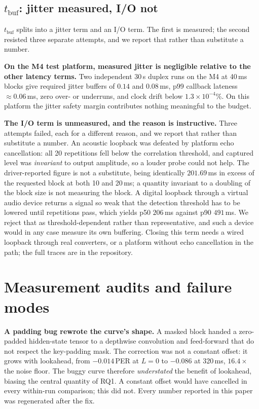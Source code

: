 \documentclass[journal]{IEEEtran}
\newcommand{\tbuf}{\ensuremath{t_{\mathrm{buf}}}}
\begin{document}
\subsection{\texorpdfstring{\tbuf{}}{t\_buf}: jitter measured, I/O not}

\tbuf{} splits into a jitter term and an I/O term. The first is measured; the
second resisted three separate attempts, and we report that rather than
substitute a number.

\textbf{On the M4 test platform, measured jitter is negligible relative to the
other latency terms.} Two independent 30\,s duplex runs on the M4 at
40\,ms blocks give required jitter buffers of $0.14$ and $0.08$\,ms, p99
callback lateness ${\approx}0.06$\,ms, zero over- or underruns, and clock drift
below $1.3\times10^{-4}$\%. On this platform the jitter safety margin
contributes nothing meaningful to the budget.

\textbf{The I/O term is unmeasured, and the reason is instructive.} Three
attempts failed, each for a different reason, and we report that rather than
substitute a number. An acoustic loopback was defeated by platform echo
cancellation: all 20 repetitions fell below the correlation threshold, and
captured level was \emph{invariant} to output amplitude, so a louder probe
could not help. The driver-reported figure is not a substitute, being
identically $201.69$\,ms in excess of the requested block at both 10 and
20\,ms; a quantity invariant to a doubling of the block size is not measuring
the block. A digital loopback through a virtual audio device returns a signal
so weak that the detection threshold has to be lowered until repetitions pass,
which yields p50 $206$\,ms against p90 $491$\,ms. We reject that as
threshold-dependent rather than representative, and such a device would in any
case measure its own buffering. Closing this term needs a wired loopback
through real converters, or a platform without echo cancellation in the path;
the full traces are in the repository.

\section{Measurement audits and failure modes}
\label{sec:lessons}

\textbf{A padding bug rewrote the curve's shape.} A masked block handed a
zero-padded hidden-state tensor to a depthwise convolution and feed-forward
that do not respect the key-padding mask. The correction was not a constant
offset: it grows with lookahead, from $-0.014$\,PER at $L{=}0$ to $-0.086$
at 320\,ms, $16.4\times$ the noise floor. The buggy curve therefore
\emph{understated} the benefit of lookahead, biasing the central quantity of
RQ1. A constant offset would have cancelled in every within-run comparison;
this did not. Every number reported in this paper was regenerated after the
fix.
\end{document}
